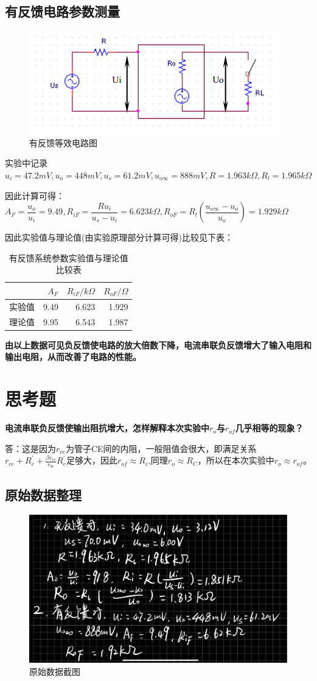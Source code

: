 \documentclass[a4 paper,12pt]{article}
\begin{document}
	\subsection{有反馈电路参数测量}
		\begin{figure}[H]
		\centering
		\hspace{2em}\includegraphics[width=.65\linewidth]{pic/4.png}
		\caption{有反馈等效电路图
		}
	\end{figure}
\par 实验中记录$u_{i}=47.2mV,u_{o}=448mV,u_{s}=61.2mV,u_{o\infty}=888mV,R=1.963k\Omega,R_{l}=1.965k\Omega$
\par 因此计算可得：$A_{F}=\dfrac{u_{o}}{u_{i}}=9.49,R_{iF}=\dfrac{Ru_{i}}{u_{s}-u_{i}}=6.623k\Omega,R_{oF}=R_{l}(\dfrac{u_{o\infty}-u_{o}}{u_{o}})=1.929k\Omega$
\par 因此实验值与理论值(由实验原理部分计算可得)比较见下表：
\begin{table}[H]
	\centering
	\caption{有反馈系统参数实验值与理论值比较表}
	\begin{tabular}{|r|r|r|r|}
		\toprule[0.5mm]
		&$A_{F}$&$R_{iF}/k\Omega$&$R_{oF}/\Omega$\\
		\midrule
		实验值&9.49&6.623&1.929\\
		\midrule
		理论值&9.95&6.543&1.987\\
		\bottomrule[0.5mm]
	\end{tabular}
\end{table}
\par \textbf{由以上数据可见负反馈使电路的放大倍数下降，电流串联负反馈增大了输入电阻和输出电阻，从而改善了电路的性能。}
	\section{思考题}
	\noindent
	\textbf{电流串联负反馈使输出阻抗增大，怎样解释本次实验中$r_{o}$与$r_{of}$几乎相等的现象？}
		\par 答：这是因为$r_{ce}$为管子CE间的内阻，一般阻值会很大，即满足关系$r_{ce}+R_{e}^{\prime}+\frac{\beta r_{ce}}{r_{be}}R_{e}^{\prime}$足够大，因此$r_{of}\approx R_{c}$,同理$r_{o}\approx R_{C}$，所以在本次实验中$r_{o}\approx r_{of}$。
	
	\begin{appendices}
		\section{原始数据整理}
		\begin{figure}[H]
	\centering
	\includegraphics[width=.7\linewidth]{pic/1.jpg} 
	\caption{原始数据截图}
\end{figure}
	\end{appendices}
\end{document}
